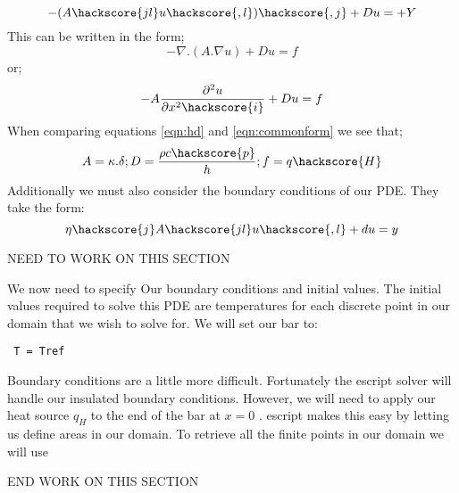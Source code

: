 \begin{equation}\label{eqn:simpfrm}
-(A\hackscore{jl} u\hackscore{,l})\hackscore{,j}+D u =+Y
\end{equation}
This can be written in the form;
\begin{equation}	
-\nabla.(A.\nabla u) + Du = f
\end{equation}
or;
\begin{equation}\label{eqn:commonform}
-A\frac{\partial^{2}u}{\partial x^{2}\hackscore{i}} + Du = f
\end{equation}
When comparing equations \eqref{eqn:hd} and \eqref{eqn:commonform} we see that;
\begin{equation}
A = \kappa . \delta; D = \frac{\rho c \hackscore{p}}{h}; f = q \hackscore{H}
\end{equation}
Additionally we must also consider the boundary conditions of our PDE. They take the form:
\begin{equation}
\eta \hackscore{j} A\hackscore{jl} u\hackscore{,l} + du = y
\end{equation}


NEED TO WORK ON THIS SECTION

We now need to specify Our boundary conditions and initial values. The initial values required to solve this PDE are temperatures for each discrete point in our domain that we wish to solve for. We will set our bar to:
\begin{verbatim}
 T = Tref
\end{verbatim}
Boundary conditions are a little more difficult. Fortunately the escript solver will handle our insulated boundary conditions. However, we will need to apply our heat source $q_{H}$ to the end of the bar at $x=0$ . escript makes this easy by letting us define areas in our domain. To retrieve all the finite points in our domain we will use 

END WORK ON THIS SECTION

